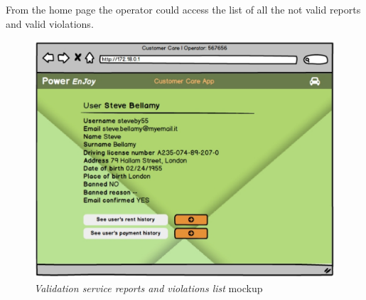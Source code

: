 From the home page the operator could access the list of all the not valid reports and valid violations.

\begin{figure}[ht!]
	\centering
	\includegraphics[width=0.8\linewidth]{mockups/customerCare2}
	\caption{
		\label{fig:cc2} 
		\emph{Validation service reports and violations list} mockup
	}
\end{figure}